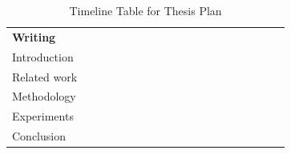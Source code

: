\documentclass[11pt]{artikel3}
\begin{document}
\begin{table}[!b]
\begin{center}
{\begin{tabular}{l| llllll | llll | llll | llll}
\textbf{Writing} & \\
{\quad}Introduction                        &  &  &  &  &  &  &  &  &  &  &\D&  &          \\
{\quad}Related work                        &  &\D&  &  &  &\D&  &  &  &\D&  &  &\D&    \\
{\quad}Methodology                         &  &  &  &  &  &  &  &  &\D&\D&\D&\D&  &\D      \\
{\quad}Experiments                         &  &  &\D&\D&\D&\D&  &  &  &  &  &  &\D&\D     \\
{\quad}Conclusion                          &  &  &  &  &  &  &  &  &  &  &  &  &  &\D       \\
\end{tabular}}
\end{center}

\caption{Timeline Table for Thesis Plan}
\end{table}
\end{document}
